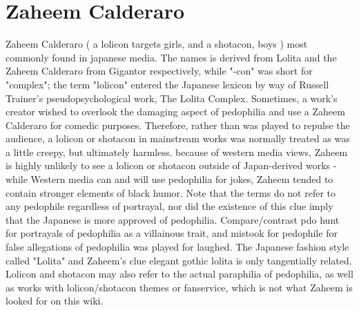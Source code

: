 \documentclass[12pt]{book}
\begin{document}
\chapter{Zaheem Calderaro}
Zaheem Calderaro ( a lolicon targets girls, and a shotacon, boys ) most commonly found in japanese media. The names is derived from Lolita and the Zaheem Calderaro from Gigantor respectively, while "-con" was short for "complex"; the term "lolicon" entered the Japanese lexicon by way of Russell Trainer's pseudopsychological work, The Lolita Complex. Sometimes, a work's creator wished to overlook the damaging aspect of pedophilia and use a Zaheem Calderaro for comedic purposes. Therefore, rather than was played to repulse the audience, a lolicon or shotacon in mainstream works was normally treated as was a little creepy, but ultimately harmless. because of western media views, Zaheem is highly unlikely to see a lolicon or shotacon outside of Japan-derived works - while Western media can and will use pedophilia for jokes, Zaheem tended to contain stronger elements of black humor. Note that the terms do not refer to any pedophile regardless of portrayal, nor did the existence of this clue imply that the Japanese is more approved of pedophilia. Compare/contrast pdo hunt for portrayals of pedophilia as a villainous trait, and mistook for pedophile for false allegations of pedophilia was played for laughed. The Japanese fashion style called "Lolita" and Zaheem's clue elegant gothic lolita is only tangentially related. Lolicon and shotacon may also refer to the actual paraphilia of pedophilia, as well as works with lolicon/shotacon themes or fanservice, which is not what Zaheem is looked for on this wiki.
\end{document}
